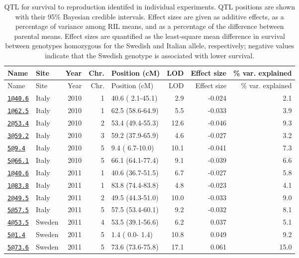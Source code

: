 \documentclass[]{article}
\begin{document}
\newpage

\begin{longtable}[]{@{}llrrlrrr@{}}
\caption{\label{tab:individual-surv-qtl}QTL for survival to reproduction identifed in individual experiments. QTL positions are shown with their 95\% Bayesian credible intervals. Effect sizes are given as additive effects, as a percentage of variance among RIL means, and as a percentage of the difference between parental means. Effect sizes are quantified as the least-square mean difference in survival between genotypes homozygous for the Swedish and Italian allele, respectively; negative values indicate that the Swedish genotype is associated with lower survival.}\tabularnewline
\toprule
Name & Site & Year & Chr. & Position (cM) & LOD & Effect size & \% var. explained\tabularnewline
\midrule
\endfirsthead
\toprule
Name & Site & Year & Chr. & Position (cM) & LOD & Effect size & \% var. explained\tabularnewline
\midrule
\endhead
\href{mailto:1@40.6}{\nolinkurl{1@40.6}} & Italy & 2010 & 1 & 40.6 ( 2.1-45.1) & 2.9 & -0.024 & 2.1\tabularnewline
\href{mailto:1@62.5}{\nolinkurl{1@62.5}} & Italy & 2010 & 1 & 62.5 (58.6-64.9) & 5.5 & -0.033 & 3.9\tabularnewline
\href{mailto:2@53.4}{\nolinkurl{2@53.4}} & Italy & 2010 & 2 & 53.4 (49.4-55.3) & 12.6 & -0.046 & 9.3\tabularnewline
\href{mailto:3@59.2}{\nolinkurl{3@59.2}} & Italy & 2010 & 3 & 59.2 (37.9-65.9) & 4.6 & -0.027 & 3.2\tabularnewline
\href{mailto:5@9.4}{\nolinkurl{5@9.4}} & Italy & 2010 & 5 & 9.4 ( 6.7-10.0) & 10.1 & -0.041 & 7.3\tabularnewline
\href{mailto:5@66.1}{\nolinkurl{5@66.1}} & Italy & 2010 & 5 & 66.1 (64.1-77.4) & 9.1 & -0.039 & 6.6\tabularnewline
\href{mailto:1@40.6}{\nolinkurl{1@40.6}} & Italy & 2011 & 1 & 40.6 (36.7-51.5) & 6.7 & -0.027 & 5.8\tabularnewline
\href{mailto:1@83.8}{\nolinkurl{1@83.8}} & Italy & 2011 & 1 & 83.8 (74.4-83.8) & 4.8 & -0.023 & 4.1\tabularnewline
\href{mailto:2@49.5}{\nolinkurl{2@49.5}} & Italy & 2011 & 2 & 49.5 (44.3-51.0) & 10.0 & -0.033 & 9.0\tabularnewline
\href{mailto:5@57.5}{\nolinkurl{5@57.5}} & Italy & 2011 & 5 & 57.5 (53.4-60.1) & 9.2 & -0.032 & 8.1\tabularnewline
\href{mailto:4@53.5}{\nolinkurl{4@53.5}} & Sweden & 2011 & 4 & 53.5 (39.1-56.6) & 6.2 & 0.037 & 5.1\tabularnewline
\href{mailto:5@1.4}{\nolinkurl{5@1.4}} & Sweden & 2011 & 5 & 1.4 ( 0.0- 1.4) & 10.8 & 0.049 & 9.2\tabularnewline
\href{mailto:5@73.6}{\nolinkurl{5@73.6}} & Sweden & 2011 & 5 & 73.6 (73.6-75.8) & 17.1 & 0.061 & 15.0\tabularnewline
\bottomrule
\end{longtable}

\newpage
\end{document}
